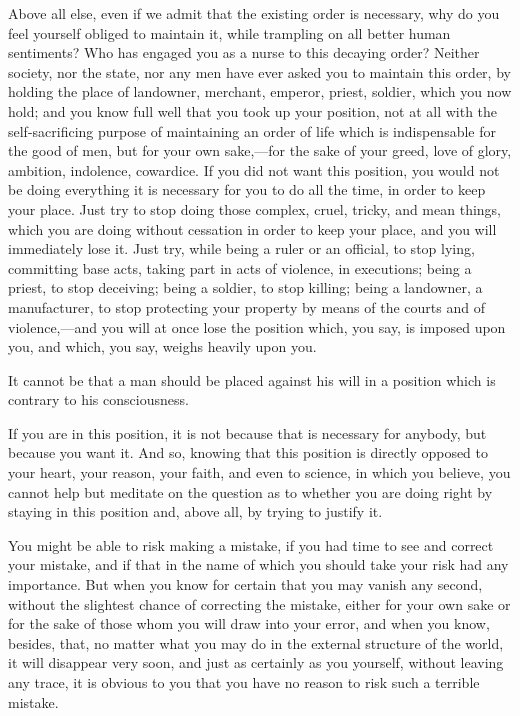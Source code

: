 \documentclass{book}
\begin{document}
Above all else, even if we admit that the existing order is necessary, why do you feel yourself obliged to maintain it, while trampling on all better human sentiments? Who has engaged you as a nurse to this decaying order? Neither society, nor the state, nor any men have ever asked you to maintain this order, by holding the place of landowner, merchant, emperor, priest, soldier, which you now hold; and you know full well that you took up your position, not at all with the self-sacrificing purpose of maintaining an order of life which is indispensable for the good of men, but for your own sake,—for the sake of your greed, love of glory, ambition, indolence, cowardice. If you did not want this position, you would not be doing everything it is necessary for you to do all the time, in order to keep your place. Just try to stop doing those complex, cruel, tricky, and mean things, which you are doing without cessation in order to keep your place, and you will immediately lose it. Just try, while being a ruler or an official, to stop lying, committing base acts, taking part in acts of violence, in executions; being a priest, to stop deceiving; being a soldier, to stop killing; being a landowner, a manufacturer, to stop protecting your property by means of the courts and of violence,—and you will at once lose the position which, you say, is imposed upon you, and which, you say, weighs heavily upon you.

It cannot be that a man should be placed against his will in a position which is contrary to his consciousness.

If you are in this position, it is not because that is necessary for anybody, but because you want it. And so, knowing that this position is directly opposed to your heart, your reason, your faith, and even to science, in which you believe, you cannot help but meditate on the question as to whether you are doing right by staying in this position and, above all, by trying to justify it.

You might be able to risk making a mistake, if you had time to see and correct your mistake, and if that in the name of which you should take your risk had any importance. But when you know for certain that you may vanish any second, without the slightest chance of correcting the mistake, either for your own sake or for the sake of those whom you will draw into your error, and when you know, besides, that, no matter what you may do in the external structure of the world, it will disappear very soon, and just as certainly as you yourself, without leaving any trace, it is obvious to you that you have no reason to risk such a terrible mistake.
\end{document}
